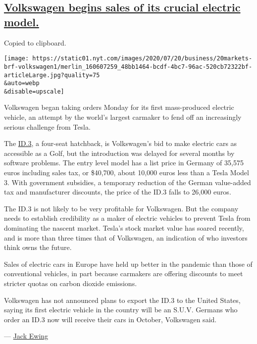 \hypertarget{volkswagen-begins-sales-of-its-crucial-electric-model}{%
\subsection{\texorpdfstring{\protect\hyperlink{volkswagen-begins-sales-of-its-crucial-electric-model}{Volkswagen
begins sales of its crucial electric
model.}}{Volkswagen begins sales of its crucial electric model.}}\label{volkswagen-begins-sales-of-its-crucial-electric-model}}

Copied to clipboard.

\texttt{[image: https://static01.nyt.com/images/2020/07/20/business/20markets-brf-volkswagen1/merlin\_160607259\_48bb1464-bcdf-4bc7-96ac-520cb72322bf-articleLarge.jpg?quality=75\\\&auto=webp\\\&disable=upscale]}

Volkswagen began taking orders Monday for its first mass-produced
electric vehicle, an attempt by the world's largest carmaker to fend off
an increasingly serious challenge from Tesla.

The
\href{https://www.nytimes.com/2019/09/08/business/volkswagen-trademark-electric-vehicles.html}{ID.3},
a four-seat hatchback, is Volkswagen's bid to make electric cars as
accessible as a Golf, but the introduction was delayed for several
months by software problems. The entry level model has a list price in
Germany of 35,575 euros including sales tax, or \$40,700, about 10,000
euros less than a Tesla Model 3. With government subsidies, a temporary
reduction of the German value-added tax and manufacturer discounts, the
price of the ID.3 falls to 26,000 euros.

The ID.3 is not likely to be very profitable for Volkswagen. But the
company needs to establish credibility as a maker of electric vehicles
to prevent Tesla from dominating the nascent market. Tesla's stock
market value has soared recently, and is more than three times that of
Volkswagen, an indication of who investors think owns the future.

Sales of electric cars in Europe have held up better in the pandemic
than those of conventional vehicles, in part because carmakers are
offering discounts to meet stricter quotas on carbon dioxide emissions.

Volkswagen has not announced plans to export the ID.3 to the United
States, saying its first electric vehicle in the country will be an
S.U.V. Germans who order an ID.3 now will receive their cars in October,
Volkswagen said.

--- \href{https://www.nytimes.com/by/jack-ewing}{Jack Ewing}

